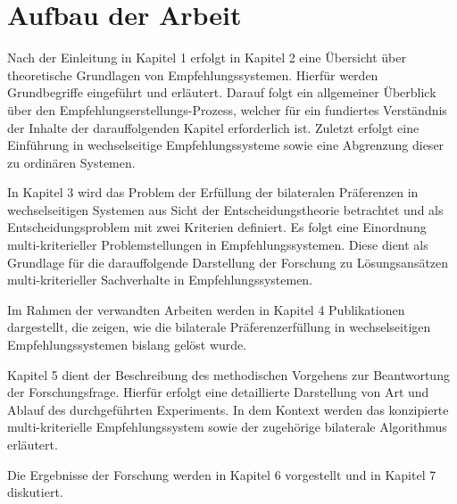 \section{Aufbau der Arbeit}
\label{sec:einleitung:aufbau_der_arbeit}
Nach der Einleitung in Kapitel 1 erfolgt in Kapitel 2 eine Übersicht über theoretische Grundlagen von Empfehlungssystemen.
Hierfür werden Grundbegriffe eingeführt und erläutert.
Darauf folgt ein allgemeiner Überblick über den Empfehlungserstellungs-Prozess, welcher für ein fundiertes Verständnis der Inhalte der darauffolgenden Kapitel erforderlich ist.
Zuletzt erfolgt eine Einführung in wechselseitige Empfehlungssysteme sowie eine Abgrenzung dieser zu ordinären Systemen.

In Kapitel 3 wird das Problem der Erfüllung der bilateralen Präferenzen in wechselseitigen Systemen aus Sicht der Entscheidungstheorie betrachtet und als Entscheidungsproblem mit zwei Kriterien definiert.
Es folgt eine Einordnung multi-kriterieller Problemstellungen in Empfehlungssystemen.
Diese dient als Grundlage für die darauffolgende Darstellung der Forschung zu Lösungsansätzen multi-kriterieller Sachverhalte in Empfehlungssystemen.

Im Rahmen der verwandten Arbeiten werden in Kapitel 4 Publikationen dargestellt, die zeigen, wie die bilaterale Präferenzerfüllung in wechselseitigen Empfehlungssystemen bislang gelöst wurde.

Kapitel 5 dient der Beschreibung des methodischen Vorgehens zur Beantwortung der Forschungsfrage.
Hierfür erfolgt eine detaillierte Darstellung von Art und Ablauf des durchgeführten Experiments.
In dem Kontext werden das konzipierte multi-kriterielle Empfehlungssystem sowie der zugehörige bilaterale Algorithmus erläutert.

Die Ergebnisse der Forschung werden in Kapitel 6 vorgestellt und in Kapitel 7 diskutiert.


